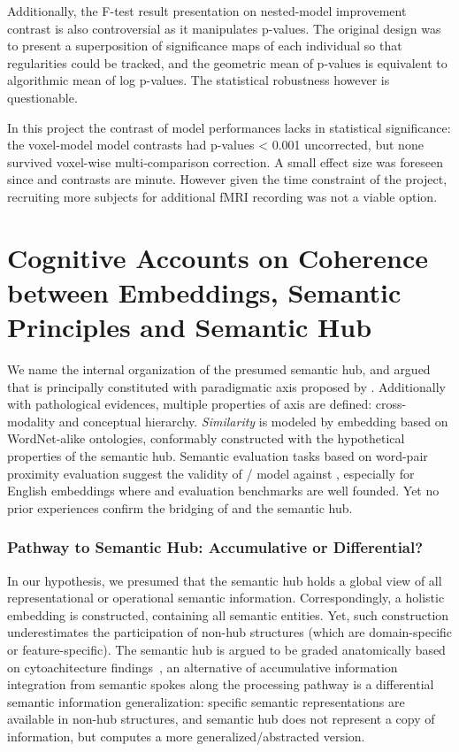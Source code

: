 Additionally, the F-test result presentation on nested-model improvement contrast is also controversial as it manipulates p-values. The original design was to present a superposition of significance maps of each individual so that regularities could be tracked, and the geometric mean of p-values is equivalent to algorithmic mean of log p-values. The statistical robustness however is questionable. 

In this project the contrast of model performances lacks in statistical significance: the voxel-model model contrasts had p-values < 0.001 uncorrected, but none survived voxel-wise multi-comparison correction. A small effect size was foreseen since \similarity and \association contrasts are minute. However given the time constraint of the project, recruiting more subjects for additional fMRI recording was not a viable option.

\section{Cognitive Accounts on Coherence between Embeddings, Semantic Principles and Semantic Hub}

We name \similarity the internal organization of the presumed semantic hub, and argued that \similarity is principally constituted with paradigmatic axis proposed by \citeauthor{jakobsonFundamentalsLanguage1963}. Additionally with pathological evidences, multiple properties of \similarity axis are defined: cross-modality and conceptual hierarchy. \emph{Similarity} is modeled by embedding based on WordNet-alike ontologies, conformably constructed with the hypothetical properties of the semantic hub. Semantic evaluation tasks based on word-pair proximity evaluation suggest the validity of / model against \similarity, especially for English embeddings where  and evaluation benchmarks are well founded. Yet no prior experiences confirm the bridging of \similarity and the semantic hub. 

\subsubsection{Pathway to Semantic Hub: Accumulative or Differential?}

In our hypothesis, we presumed that the semantic hub holds a global view of all representational or operational semantic information. Correspondingly, a holistic \similarity embedding is constructed,  containing all semantic entities. Yet, such construction underestimates the participation of non-hub structures (which are domain-specific or feature-specific). The semantic hub is argued to be graded anatomically based on cytoachitecture findings~\parencite{ralphNeuralComputationalBases2017}, an alternative of accumulative information integration from semantic spokes along the processing pathway is a differential semantic information generalization: specific semantic representations are available in non-hub structures, and semantic hub does not represent a copy of information, but computes a more generalized/abstracted version. 

